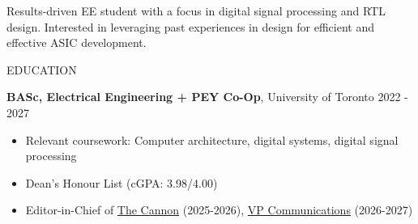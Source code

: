 \documentclass{resume}
\begin{document}
Results-driven EE student with a focus in digital signal processing and RTL design. Interested in leveraging past experiences in design for efficient and effective ASIC development.  

\begin{rSection}{EDUCATION}

   {\bf BASc, Electrical Engineering + PEY Co-Op}, University of Toronto \hfill {2022 - 2027}
   \vspace{-0.2cm}
   \begin{itemize}
    \itemsep -8pt {} 
     \item Relevant coursework: Computer architecture, digital systems, digital signal processing
     \item Dean's Honour List (cGPA: 3.98/4.00)
     \item Editor-in-Chief of \href{https://cannon.skule.ca}{The Cannon} (2025-2026), \href{https://skule.ca/about/engsoc.html}{VP Communications} (2026-2027)
   \end{itemize}



\end{rSection}
\end{document}
